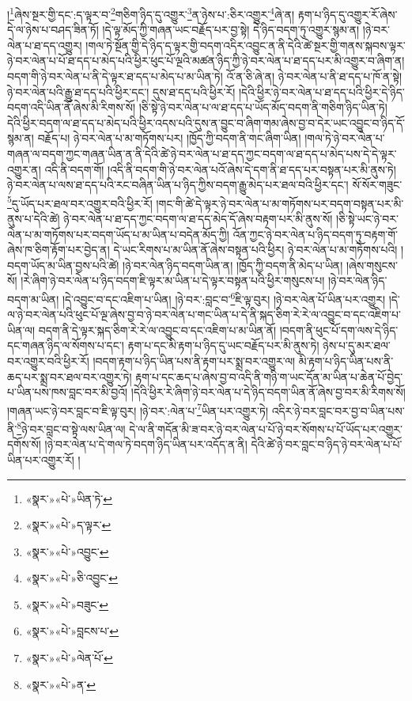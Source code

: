 །\footnote{«སྣར་»«པེ་»ཡིན་ཏེ་}ཞེས་སྔར་གྱི་དང་:ད་ལྟར་བ་\footnote{«སྣར་»«པེ་»ད་ལྟར་}གཅིག་ཉིད་དུ་འགྱུར་\footnote{«སྣར་»«པེ་»འབྱུང་}ན་ཉེས་པ་:ཅིར་འགྱུར་\footnote{«སྣར་»«པེ་»ཅི་འབྱུང་}ཞེ་ན། རྟག་པ་ཉིད་དུ་འགྱུར་རོ་ཞེས་དེ་ལ་ཉེས་པ་བཤད་ཟིན་ཏོ། །དེ་ལྟ་མོད་ཀྱི་གཞན་ཡང་བརྗོད་པར་བྱ་སྟེ། དེ་ཉིད་བདག་ཏུ་འགྱུར་སྙམ་ན། །ཉེ་བར་ལེན་པ་ཐ་དད་འགྱུར། །གལ་ཏེ་སྔོན་གྱི་དེ་ཉིད་ད་ལྟར་གྱི་བདག་འདིར་འབྱུང་ན་ནི་དེའི་ཚེ་སྔར་གྱི་གནས་སྐབས་ལྟར་ཉེ་བར་ལེན་པ་པོ་ཐ་དད་པ་མེད་པའི་ཕྱིར་ཕུང་པོ་ལྔའི་མཚན་ཉིད་ཀྱི་ཉེ་བར་ལེན་པ་ཐ་དད་པར་མི་འགྱུར་བ་ཞིག་ན། བདག་གི་ཉེ་བར་ལེན་པ་ནི་དེ་ལྟར་ཐ་དད་པ་མེད་པ་མ་ཡིན་ཏེ། འོ་ན་ཅི་ཞེ་ན། ཉེ་བར་ལེན་པ་ནི་ཐ་དད་པ་ཁོ་ན་སྟེ། ཉེ་བར་ལེན་པའི་རྒྱུ་ཐ་དད་པའི་ཕྱིར་དང་། དུས་ཐ་དད་པའི་ཕྱིར་རོ། །དེའི་ཕྱིར་ཉེ་བར་ལེན་པ་ཐ་དད་པའི་ཕྱིར་དེ་ཉིད་བདག་འདི་ཡིན་ནོ་ཞེས་མི་རིགས་སོ། །ཅི་སྟེ་ཉེ་བར་ལེན་པ་ལ་ཐ་དད་པ་ཡོད་མོད་བདག་ནི་གཅིག་ཉིད་ཡིན་ཏེ། དེའི་ཕྱིར་བདག་ལ་ཐ་དད་པ་མེད་པའི་ཕྱིར་འདས་པའི་དུས་ན་བྱུང་བ་ཞིག་གམ་ཞེས་བྱ་བ་དེར་ཡང་འབྱུང་བ་ཉིད་དོ་སྙམ་ན། བརྗོད་པ། ཉེ་བར་ལེན་པ་མ་གཏོགས་པར། །ཁྱོད་ཀྱི་བདག་ནི་གང་ཞིག་ཡིན། །གལ་ཏེ་ཉེ་བར་ལེན་པ་གཞན་ལ་བདག་ཀྱང་གཞན་ཡིན་ན་ནི་དེའི་ཚེ་ཉེ་བར་ལེན་པ་ཐ་དད་ཀྱང་བདག་ལ་ཐ་དད་པ་མེད་པས་དེ་དེ་ལྟར་འགྱུར་ན། འདི་ནི་བདག་གོ། །འདི་ནི་བདག་གི་ཉེ་བར་ལེན་པའོ་ཞེས་དེ་དག་ནི་ཐ་དད་པར་བསྟན་པར་མི་ནུས་ཏེ། ཉེ་བར་ལེན་པ་ལས་ཐ་དད་པའི་རང་བཞིན་ཡིན་པ་ཉིད་ཀྱིས་བདག་རྒྱུ་མེད་པར་ཐལ་བའི་ཕྱིར་དང་། སོ་སོར་གཟུང་\footnote{«སྣར་»«པེ་»བཟུང་}དུ་ཡོད་པར་ཐལ་བར་འགྱུར་བའི་ཕྱིར་རོ། །གང་གི་ཚེ་དེ་ལྟར་ཉེ་བར་ལེན་པ་མ་གཏོགས་པར་བདག་བསྟན་པར་མི་ནུས་པ་དེའི་ཚེ། ཉེ་བར་ལེན་པ་ཐ་དད་ཀྱང་བདག་ལ་ཐ་དད་མེད་དོ་ཞེས་བརྟག་པར་མི་ནུས་སོ། །ཅི་སྟེ་ཡང་ཉེ་བར་ལེན་པ་མ་གཏོགས་པར་བདག་ཡོད་པ་མ་ཡིན་པ་བདེན་མོད་ཀྱི། འོན་ཀྱང་ཉེ་བར་ལེན་པ་ཉིད་བདག་ཏུ་བརྟག་གོ་ཞེས་ཁ་ཅིག་རྟོག་པར་བྱེད་ན། དེ་ཡང་རིགས་པ་མ་ཡིན་ནོ་ཞེས་བསྟན་པའི་ཕྱིར། ཉེ་བར་ལེན་པ་མ་གཏོགས་པའི། །བདག་ཡོད་མ་ཡིན་བྱས་པའི་ཚེ། །ཉེ་བར་ལེན་ཉིད་བདག་ཡིན་ན། །ཁྱོད་ཀྱི་བདག་ནི་མེད་པ་ཡིན། །ཞེས་གསུངས་སོ། །རེ་ཞིག་ཉེ་བར་ལེན་པ་ཉིད་བདག་ཇི་ལྟར་མ་ཡིན་པ་དེ་ལྟར་བསྟན་པའི་ཕྱིར་གསུངས་པ། །ཉེ་བར་ལེན་ཉིད་བདག་མ་ཡིན། །དེ་འབྱུང་བ་དང་འཇིག་པ་ཡིན། །ཉེ་བར་:བླང་བ་\footnote{«སྣར་»«པེ་»བླངས་པ་}ཇི་ལྟ་བུར། །ཉེ་བར་ལེན་པོ་ཡིན་པར་འགྱུར། །དེ་ལ་ཉེ་བར་ལེན་པའི་ཕུང་པོ་ལྔ་ཞེས་བྱ་བ་ཉེ་བར་ལེན་པ་གང་ཡིན་པ་དེ་ནི་སྐད་ཅིག་རེ་རེ་ལ་འབྱུང་བ་དང་འཇིག་པ་ཡིན་ལ། བདག་ནི་དེ་ལྟར་སྐད་ཅིག་རེ་རེ་ལ་འབྱུང་བ་དང་འཇིག་པ་མ་ཡིན་ནོ། །བདག་ནི་ཕུང་པོ་དག་ལས་དེ་ཉིད་དང་གཞན་ཉིད་ལ་སོགས་པ་དང་། རྟག་པ་དང་མི་རྟག་པ་ཉིད་དུ་ཡང་བརྗོད་པར་མི་ནུས་ཏེ། ཉེས་པ་དུ་མར་ཐལ་བར་འགྱུར་བའི་ཕྱིར་རོ། །བདག་རྟག་པ་ཉིད་ཡིན་པས་ནི་རྟག་པར་སྨྲ་བར་འགྱུར་ལ། མི་རྟག་པ་ཉིད་ཡིན་པས་ནི་ཆད་པར་སྨྲ་བར་ཐལ་བར་འགྱུར་ཏེ། རྟག་པ་དང་ཆད་པ་ཞེས་བྱ་བ་འདི་ནི་གཉི་ག་ཡང་དོན་མ་ཡིན་པ་ཆེན་པོ་བྱེད་པ་ཡིན་པས་ཁས་བླང་བར་མི་བྱའོ། །དེའི་ཕྱིར་རེ་ཞིག་ཉེ་བར་ལེན་པ་དེ་ཉིད་བདག་ཡིན་ནོ་ཞེས་བྱ་བར་མི་རིགས་སོ། །གཞན་ཡང་ཉེ་བར་བླང་བ་ཇི་ལྟ་བུར། །ཉེ་བར་:ལེན་པ་\footnote{«སྣར་»«པེ་»ལེན་པོ་}ཡིན་པར་འགྱུར་ཏེ། འདིར་ཉེ་བར་བླང་བར་བྱ་བ་ཡིན་པས་ནི་\footnote{«སྣར་»«པེ་»ན་}ཉེ་བར་བླང་བ་སྟེ་ལས་ཡིན་ལ། དེ་ལ་ནི་གདོན་མི་ཟ་བར་ཉེ་བར་ལེན་པ་པོ་ཉེ་བར་སོགས་པ་པོ་ཡོད་པར་འགྱུར་དགོས་སོ། །ཉེ་བར་ལེན་པ་དེ་གལ་ཏེ་བདག་ཉིད་ཡིན་པར་འདོད་ན་ནི། དེའི་ཚེ་ཉེ་བར་བླང་བ་ཉིད་ཉེ་བར་ལེན་པ་པོ་ཡིན་པར་འགྱུར་རོ། །
